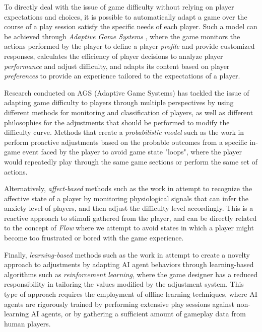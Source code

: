 To directly deal with the issue of game difficulty without relying on player expectations and choices, it is possible to automatically adapt a game over the course of a play session satisfy the specific needs of each player. Such a model can be achieved through \emph{Adaptive Game Systems} \cite{ARTICLE_PlayerCentredGameDesign}, where the game monitors the actions performed by the player to define a player \emph{profile} and provide customized responses, calculates the efficiency of player decisions to analyze player \emph{performance} and adjust difficulty, and adapts its content based on player \emph{preferences} to provide an experience tailored to the expectations of a player.

Research conducted on AGS (Adaptive Game Systems) has tackled the issue of adapting game difficulty to players through multiple perspectives by using different methods for monitoring and classification of players, as well as different philosophies for the adjustments that should be performed to modify the difficulty curve. Methods that create a \emph{probabilistic model} such as the work in \cite{article_casefordda} perform proactive adjustments based on the probable outcomes from a specific in-game event faced by the player to avoid game state "loops", where the player would repeatedly play through the same game sections or perform the same set of actions.

Alternatively, \emph{affect-based} methods such as the work in \cite{article_affectivedda} attempt to recognize the affective state of a player by monitoring physiological signals that can infer the anxiety level of players, and then adjust the difficulty level accordingly. This is a reactive approach to stimuli gathered from the player, and can be directly related to the concept of \emph{Flow} where we attempt to avoid states in which a player might become too frustrated or bored with the game experience.

Finally, \emph{learning-based} methods such as the work in \cite{article_adaptivebehaviorai} attempt to create a novelty approach to adjustments by adapting AI agent behaviors through learning-based algorithms such as \emph{reinforcement learning}, where the game designer has a reduced responsibility in tailoring the values modified by the adjustment system. This type of approach requires the employment of offline learning techniques, where AI agents are rigorously trained by performing extensive play sessions against non-learning AI agents, or by gathering a sufficient amount of gameplay data from human players.

